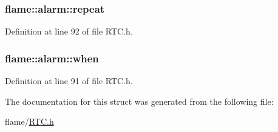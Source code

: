 \hypertarget{structflame_1_1alarm_a66e4634a1965c119d7d39798056b7340}{
\subsubsection[{repeat}]{ flame\-::alarm\-::repeat}}\label{structflame_1_1alarm_a66e4634a1965c119d7d39798056b7340}


Definition at line 92 of file R\-T\-C.\-h.

\hypertarget{structflame_1_1alarm_a5c2cc1d3e96943a144f6f965b1561e00}{
\subsubsection[{when}]{ flame\-::alarm\-::when}}\label{structflame_1_1alarm_a5c2cc1d3e96943a144f6f965b1561e00}


Definition at line 91 of file R\-T\-C.\-h.



The documentation for this struct was generated from the following file\-:\begin{DoxyCompactItemize}
\item 
flame/\hyperlink{_r_t_c_8h}{R\-T\-C.\-h}\end{DoxyCompactItemize}
